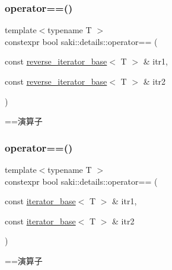 \subsubsection{\texorpdfstring{operator==()}{operator==()}\hspace{0.1cm}{\footnotesize\ttfamily [1/2]}}
{\footnotesize\ttfamily template$<$typename T $>$ \\
constexpr bool saki\+::details\+::operator== (\begin{DoxyParamCaption}\item[{const \mbox{\hyperlink{classsaki_1_1details_1_1reverse__iterator__base}{reverse\+\_\+iterator\+\_\+base}}$<$ T $>$ \&}]{itr1,  }\item[{const \mbox{\hyperlink{classsaki_1_1details_1_1reverse__iterator__base}{reverse\+\_\+iterator\+\_\+base}}$<$ T $>$ \&}]{itr2 }\end{DoxyParamCaption})}



==演算子 

\mbox{\label{namespacesaki_1_1details_ac09d938c2d3cea1119bb4a46a2c2a1b1}} 
\subsubsection{\texorpdfstring{operator==()}{operator==()}\hspace{0.1cm}{\footnotesize\ttfamily [2/2]}}
{\footnotesize\ttfamily template$<$typename T $>$ \\
constexpr bool saki\+::details\+::operator== (\begin{DoxyParamCaption}\item[{const \mbox{\hyperlink{classsaki_1_1details_1_1iterator__base}{iterator\+\_\+base}}$<$ T $>$ \&}]{itr1,  }\item[{const \mbox{\hyperlink{classsaki_1_1details_1_1iterator__base}{iterator\+\_\+base}}$<$ T $>$ \&}]{itr2 }\end{DoxyParamCaption})}



==演算子 

\mbox{\label{namespacesaki_1_1details_adc4632dd965cb0131ddadd1bacbe4971}} 
